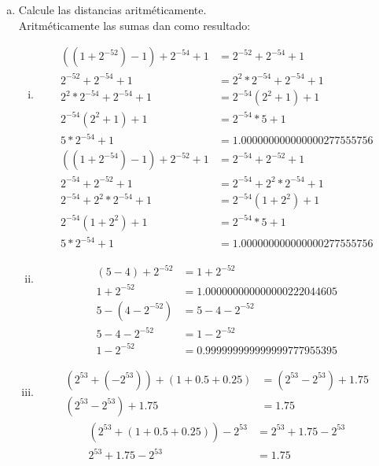\documentclass[10pt]{article}
\begin{document}
\begin{enumerate}[a)]
\item Calcule las distancias aritméticamente.\\
Aritméticamente las sumas dan como resultado:
\begin{enumerate}[(i)]
\item 
\begin{equation}
\begin{aligned}
((1 + 2^{-52}) - 1) + 2^{-54} + 1 &= 2^{-52} + 2^{-54} + 1 \\
2^{-52} + 2^{-54} + 1 &= 2^{2} * 2^{-54} + 2^{-54} + 1 \\
2^{2} * 2^{-54} + 2^{-54} + 1 &= 2^{-54}( 2^{2} + 1) + 1 \\
2^{-54}( 2^{2} + 1) + 1 &= 2^{-54} * 5 + 1 \\
5 * 2^{-54} + 1 &= 1.000000000000000277555756
\end{aligned}
\end{equation}
\begin{equation}
\begin{aligned}
((1 + 2^{-54}) - 1) + 2^{-52} + 1 &= 2^{-54} + 2^{-52} + 1\\
2^{-54} + 2^{-52} + 1 &= 2^{-54} + 2^{2} * 2^{-54} + 1 \\
2^{-54} + 2^{2} * 2^{-54} + 1 &= 2^{-54}( 1 + 2^{2}) + 1\\
2^{-54}( 1 + 2^{2}) + 1 &= 2^{-54} * 5 + 1 \\
5 * 2^{-54} + 1 &= 1.000000000000000277555756
\end{aligned}
\end{equation}

\item 
\begin{equation}
\begin{aligned}
(5 - 4) + 2^{-52} &= 1 + 2^{-52} \\
1 + 2^{-52} &= 1.000000000000000222044605
\end{aligned}
\end{equation}
\begin{equation}
\begin{aligned}
5 - (4 - 2^{-52}) &= 5 - 4 - 2^{-52}\\
5 - 4 - 2^{-52} &= 1 - 2^{-52} \\
1 - 2^{-52} &= 0.999999999999999777955395
\end{aligned}
\end{equation}

\item 
\begin{equation}
\begin{aligned}
(2^{53} + (-2^{53})) + (1 + 0.5 + 0.25) &= (2^{53} - 2^{53}) + 1.75 \\
(2^{53} - 2^{53}) + 1.75 &= 1.75
\end{aligned}
\end{equation}
\begin{equation}
\begin{aligned}
(2^{53} + (1 + 0.5 + 0.25)) - 2^{53} &= 2^{53} + 1.75 -  2^{53} \\
2^{53} + 1.75 -  2^{53} &= 1.75
\end{aligned}
\end{equation}


\end{enumerate}
\end{enumerate}
\end{document}
